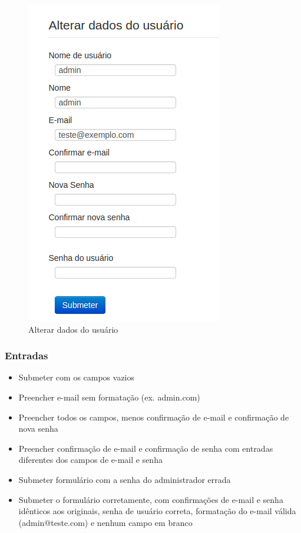 \begin{figure}[ht]
    \centering
     \includegraphics[scale=0.5]{images/alterardadosadmin.png}
     \caption{Alterar dados do usuário}
     \label{fig:alteraadmin}
\end{figure}

\subsubsection{Entradas}

\begin{itemize}

	\item Submeter com os campos vazios 
	\item Preencher e-mail sem formatação (ex. admin.com)
	\item Preencher todos os campos, menos confirmação de e-mail e confirmação de nova senha
	\item Preencher confirmação de e-mail e confirmação de senha com entradas diferentes dos campos de e-mail e senha
	\item Submeter formulário com a senha do administrador errada
	\item Submeter o formulário corretamente, com confirmações de e-mail e senha idênticos aos originais, senha de usuário correta, formatação do e-mail válida (admin@teste.com) e nenhum campo em branco
	
\end{itemize}


